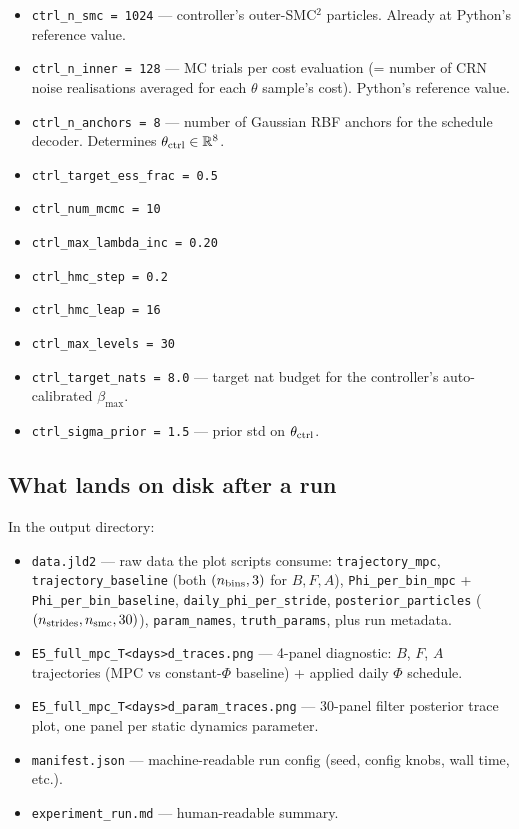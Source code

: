 \documentclass[11pt,a4paper]{article}
\begin{document}
\begin{itemize}[itemsep=2pt,leftmargin=*]
\item \texttt{ctrl\_n\_smc = 1024} --- controller's outer-SMC$^2$
  particles. Already at Python's reference value.
\item \texttt{ctrl\_n\_inner = 128} --- MC trials per cost evaluation
  (= number of CRN noise realisations averaged for each $\theta$
  sample's cost). Python's reference value.
\item \texttt{ctrl\_n\_anchors = 8} --- number of Gaussian RBF anchors
  for the schedule decoder. Determines $\theta_{\rm ctrl} \in
  \mathbb{R}^8$.
\item \texttt{ctrl\_target\_ess\_frac = 0.5}
\item \texttt{ctrl\_num\_mcmc = 10}
\item \texttt{ctrl\_max\_lambda\_inc = 0.20}
\item \texttt{ctrl\_hmc\_step = 0.2}
\item \texttt{ctrl\_hmc\_leap = 16}
\item \texttt{ctrl\_max\_levels = 30}
\item \texttt{ctrl\_target\_nats = 8.0} --- target nat budget for the
  controller's auto-calibrated $\beta_{\max}$.
\item \texttt{ctrl\_sigma\_prior = 1.5} --- prior std on $\theta_{\rm ctrl}$.
\end{itemize}

\subsection{What lands on disk after a run}

In the output directory:

\begin{itemize}[itemsep=2pt,leftmargin=*]
\item \texttt{data.jld2} --- raw data the plot scripts consume:
  \texttt{trajectory\_mpc}, \texttt{trajectory\_baseline} (both
  $(n_{\rm bins}, 3)$ for $B,F,A$), \texttt{Phi\_per\_bin\_mpc} +
  \texttt{Phi\_per\_bin\_baseline}, \texttt{daily\_phi\_per\_stride},
  \texttt{posterior\_particles} ($(n_{\rm strides}, n_{\rm smc},
  30)$), \texttt{param\_names}, \texttt{truth\_params}, plus run
  metadata.
\item \texttt{E5\_full\_mpc\_T<days>d\_traces.png} --- 4-panel
  diagnostic: $B$, $F$, $A$ trajectories (MPC vs constant-$\Phi$
  baseline) + applied daily $\Phi$ schedule.
\item \texttt{E5\_full\_mpc\_T<days>d\_param\_traces.png} --- 30-panel
  filter posterior trace plot, one panel per static dynamics parameter.
\item \texttt{manifest.json} --- machine-readable run config (seed,
  config knobs, wall time, etc.).
\item \texttt{experiment\_run.md} --- human-readable summary.
\end{itemize}
\end{document}
